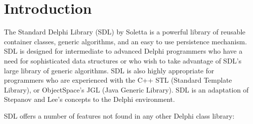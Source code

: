 \documentclass{report}
\begin{document}
\chapter{Introduction}

The Standard Delphi Library (SDL) by Soletta is a powerful library of
reusable container classes, generic algorithms, and an easy to use
persistence mechanism. SDL is designed for intermediate to advanced Delphi
programmers who have a need for sophisticated data structures or who wish to
take advantage of SDL's large library of generic algorithms. SDL is also
highly appropriate for programmers who are experienced with the C++ STL
(Standard Template Library), or ObjectSpace's JGL (Java Generic Library).
SDL is an adaptation of Stepanov and Lee's concepts to the Delphi
environment.

SDL offers a number of features not found in any other Delphi 
class library:
\end{document}
